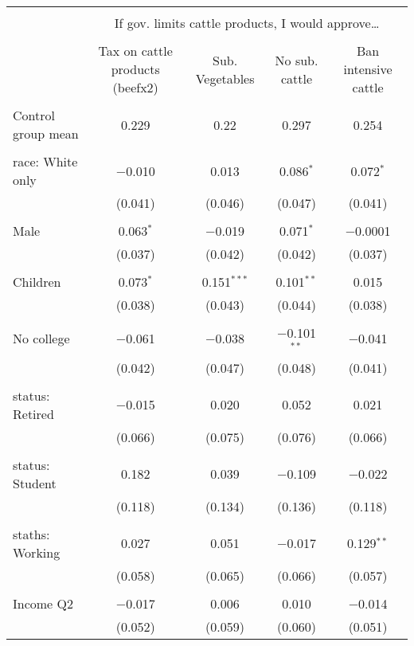 
\begin{tabular}{@{\extracolsep{5pt}}lcccc} 
\\[-1.8ex]\hline 
\hline \\[-1.8ex] 
 & \multicolumn{4}{c}{If gov. limits cattle products, I would approve…} \\ 
\cline{2-5} 
\\[-1.8ex] & Tax on cattle products (beefx2) & Sub. Vegetables & No sub. cattle & Ban intensive cattle \\ 
\hline \\[-1.8ex] 
 Control group mean & 0.229 & 0.22 & 0.297 & 0.254  \\ \hline \\[-1.8ex] race: White only & $-$0.010 & 0.013 & 0.086$^{*}$ & 0.072$^{*}$ \\ 
  & (0.041) & (0.046) & (0.047) & (0.041) \\ 
  & & & & \\ 
 Male & 0.063$^{*}$ & $-$0.019 & 0.071$^{*}$ & $-$0.0001 \\ 
  & (0.037) & (0.042) & (0.042) & (0.037) \\ 
  & & & & \\ 
 Children & 0.073$^{*}$ & 0.151$^{***}$ & 0.101$^{**}$ & 0.015 \\ 
  & (0.038) & (0.043) & (0.044) & (0.038) \\ 
  & & & & \\ 
 No college & $-$0.061 & $-$0.038 & $-$0.101$^{**}$ & $-$0.041 \\ 
  & (0.042) & (0.047) & (0.048) & (0.041) \\ 
  & & & & \\ 
 status: Retired & $-$0.015 & 0.020 & 0.052 & 0.021 \\ 
  & (0.066) & (0.075) & (0.076) & (0.066) \\ 
  & & & & \\ 
 status: Student & 0.182 & 0.039 & $-$0.109 & $-$0.022 \\ 
  & (0.118) & (0.134) & (0.136) & (0.118) \\ 
  & & & & \\ 
 staths: Working & 0.027 & 0.051 & $-$0.017 & 0.129$^{**}$ \\ 
  & (0.058) & (0.065) & (0.066) & (0.057) \\ 
  & & & & \\ 
 Income Q2 & $-$0.017 & 0.006 & 0.010 & $-$0.014 \\ 
  & (0.052) & (0.059) & (0.060) & (0.051) \\ 

\end{tabular}
